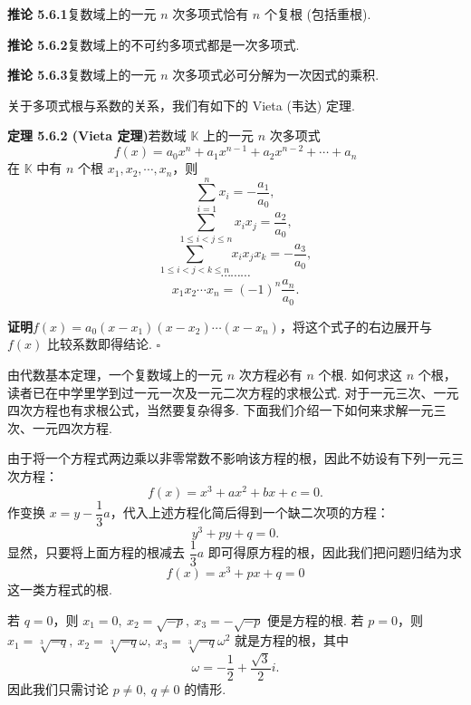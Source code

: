 \documentclass[UTF8, 12pt, fontset=fandol, oneside]{ctexart}
\begin{document}
\noindent\textbf{推论 5.6.1}\quad 复数域上的一元 $n$ 次多项式恰有 $n$ 个复根 (包括重根).

\noindent\textbf{推论 5.6.2}\quad 复数域上的不可约多项式都是一次多项式.

\noindent\textbf{推论 5.6.3}\quad 复数域上的一元 $n$ 次多项式必可分解为一次因式的乘积.

关于多项式根与系数的关系，我们有如下的 Vieta (韦达) 定理.

\noindent\textbf{定理 5.6.2 (Vieta 定理)}\quad 若数域 $\mathbb{K}$ 上的一元 $n$ 次多项式
\[
f(x)=a_0x^n+a_1x^{n-1}+a_2x^{n-2}+\cdots+a_n
\]
在 $\mathbb{K}$ 中有 $n$ 个根 $x_1,x_2,\cdots,x_n$，则
\[
\sum_{i=1}^n x_i=-\frac{a_1}{a_0},
\]
\[
\sum_{1\leq i<j\leq n}x_ix_j=\frac{a_2}{a_0},
\]
\[
\sum_{1\leq i<j<k\leq n}x_ix_jx_k=-\frac{a_3}{a_0},
\]
\[
\cdots\cdots\cdots
\]
\[
x_1x_2\cdots x_n=(-1)^n\frac{a_n}{a_0}.
\]

\noindent\textbf{证明}\quad $f(x)=a_0(x-x_1)(x-x_2)\cdots(x-x_n)$，将这个式子的右边展开与 $f(x)$ 比较系数即得结论. $\square$

由代数基本定理，一个复数域上的一元 $n$ 次方程必有 $n$ 个根. 如何求这 $n$ 个根，读者已在中学里学到过一元一次及一元二次方程的求根公式. 对于一元三次、一元四次方程也有求根公式，当然要复杂得多. 下面我们介绍一下如何来求解一元三次、一元四次方程.

由于将一个方程式两边乘以非零常数不影响该方程的根，因此不妨设有下列一元三次方程：
\[
f(x)=x^3+ax^2+bx+c=0.
\]
作变换 $x=y-\dfrac13a$，代入上述方程化简后得到一个缺二次项的方程：
\[
y^3+py+q=0.
\]
显然，只要将上面方程的根减去 $\dfrac13a$ 即可得原方程的根，因此我们把问题归结为求
\begin{equation}
f(x)=x^3+px+q=0
\tag{5.6.4}
\end{equation}
这一类方程式的根.

若 $q=0$，则 $x_1=0,\ x_2=\sqrt{-p},\ x_3=-\sqrt{-p}$ 便是方程的根. 若 $p=0$，则 $x_1=\sqrt[3]{-q},\ x_2=\sqrt[3]{-q}\omega,\ x_3=\sqrt[3]{-q}\omega^2$ 就是方程的根，其中
\[
\omega=-\frac12+\frac{\sqrt{3}}{2}i.
\]
因此我们只需讨论 $p\neq 0,\ q\neq 0$ 的情形.
\end{document}
